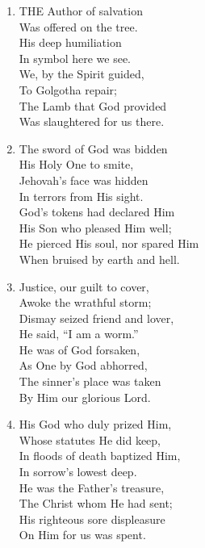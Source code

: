 \documentclass[11pt,a4paper]{article}
\begin{document}
\begin{enumerate}
    \item THE Author of salvation \\
        Was offered on the tree. \\
        His deep humiliation \\
        In symbol here we see. \\
        We, by the Spirit guided, \\
        To Golgotha repair; \\
        The Lamb that God provided \\
        Was slaughtered for us there.

    \item The sword of God was bidden \\
        His Holy One to smite, \\
        Jehovah's face was hidden \\
        In terrors from His sight. \\
        God's tokens had declared Him \\
        His Son who pleased Him well; \\
        He pierced His soul, nor spared Him \\
        When bruised by earth and hell.

    \item Justice, our guilt to cover, \\
        Awoke the wrathful storm; \\
        Dismay seized friend and lover, \\
        He said, ``I am a worm.'' \\
        He was of God forsaken, \\
        As One by God abhorred, \\
        The sinner's place was taken \\
        By Him our glorious Lord.

    \item His God who duly prized Him, \\
        Whose statutes He did keep, \\
        In floods of death baptized Him, \\
        In sorrow's lowest deep. \\
        He was the Father's treasure, \\
        The Christ whom He had sent; \\
        His righteous sore displeasure \\
        On Him for us was spent.


\end{enumerate}
\end{document}
